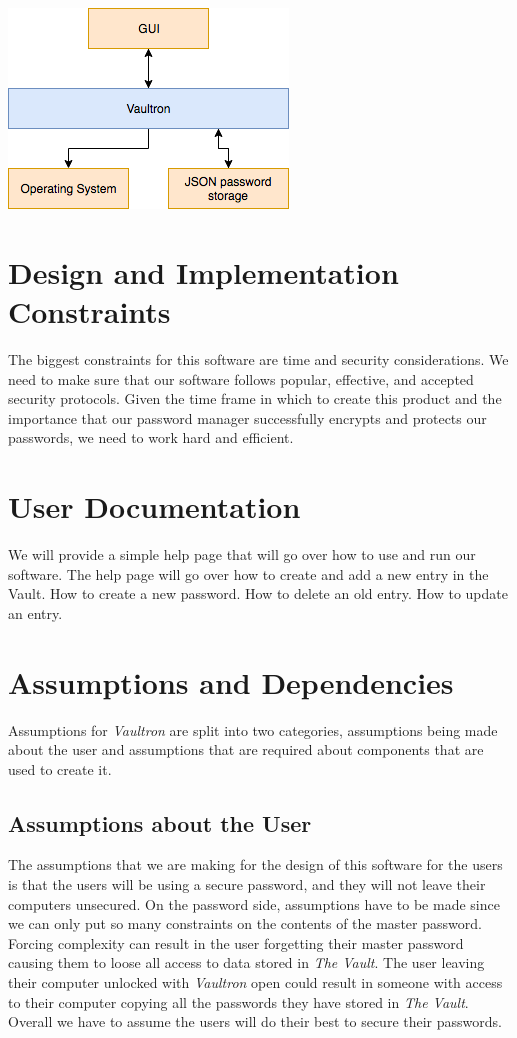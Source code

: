 \documentclass[11pt]{report}
\begin{document}
\begin{center}
\includegraphics[scale=0.77]{operating-environment.png}
\end{center}


\section{Design and Implementation Constraints}
The biggest constraints for this software are time and security considerations.
We need to make sure that our software follows popular, effective, and
accepted security protocols. Given the time frame in which to create this
product and the importance that our password manager successfully encrypts
and protects our passwords, we need to work hard and efficient.


\section{User Documentation}
We will provide a simple help page that will go over how to use and run 
our software. The help page will go over how to create and add a new entry in the 
Vault. How to create a new password. How to delete an old entry. How to update 
an entry.


\section{Assumptions and Dependencies}
Assumptions for \textit{Vaultron} are split into two categories, assumptions
being made about the user and assumptions that are required about components
that are used to create it. 


\subsection{Assumptions about the User}
The assumptions that we are making for the design of this software for the users is
that the users will be using a secure password, and they will not leave
their computers unsecured. On the password side, assumptions have to be
made since we can only put so many constraints on the contents of the
master password. Forcing complexity can result in the user forgetting 
their master password causing them to loose all access to data stored in
\textit{The Vault}. The user leaving their computer unlocked with 
\textit{Vaultron} open could result in someone with access to their computer
copying all the passwords they have stored in \textit{The Vault}. Overall
we have to assume the users will do their best to secure their passwords.
\end{document}
